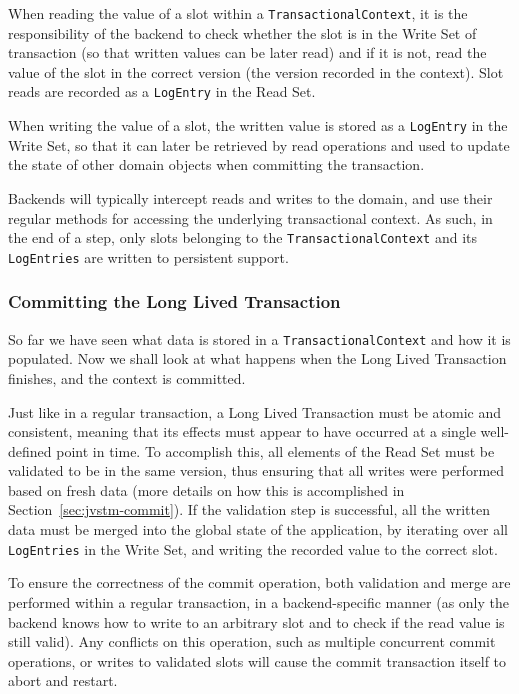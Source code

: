 \documentclass{llncs}
\begin{document}
When reading the value of a slot within a
\texttt{TransactionalContext}, it is the responsibility of the backend
to check whether the slot is in the Write Set of transaction (so that
written values can be later read) and if it is not, read the value of
the slot in the correct version (the version recorded in the
context). Slot reads are recorded as a \texttt{LogEntry} in the Read
Set.

When writing the value of a slot, the written value is stored as a
\texttt{LogEntry} in the Write Set, so that it can later be retrieved
by read operations and used to update the state of other domain
objects when committing the transaction.

Backends will typically intercept reads and writes to the domain, and
use their regular methods for accessing the underlying transactional
context. As such, in the end of a step, only slots belonging to the
\texttt{TransactionalContext} and its \texttt{LogEntries} are written
to persistent support.

\subsubsection{Committing the Long Lived Transaction}

So far we have seen what data is stored in a
\texttt{TransactionalContext} and how it is populated. Now we shall
look at what happens when the Long Lived Transaction finishes, and the
context is committed.

Just like in a regular transaction, a Long Lived Transaction must be
atomic and consistent, meaning that its effects must appear to have
occurred at a single well-defined point in time. To accomplish this,
all elements of the Read Set must be validated to be in the same
version, thus ensuring that all writes were performed based on fresh
data (more details on how this is accomplished in
Section~\ref{sec:jvstm-commit}). If the validation step is successful,
all the written data must be merged into the global state of the
application, by iterating over all \texttt{LogEntries} in the Write
Set, and writing the recorded value to the correct slot.

To ensure the correctness of the commit operation, both validation and
merge are performed within a regular transaction, in a
backend-specific manner (as only the backend knows how to write to an
arbitrary slot and to check if the read value is still valid). Any
conflicts on this operation, such as multiple concurrent commit
operations, or writes to validated slots will cause the commit
transaction itself to abort and restart.
\end{document}
